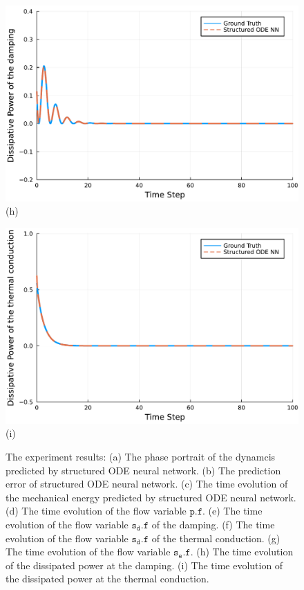 \documentclass[
	parskip, 			   %
	twoside, 			   %
	DIV=14, 			   %
	BCOR=15.0mm, 		   %
	headsepline, 		   %
	open=right, 		   %
	captions=tableheading, %
	bibliography=totoc,    %
	numbers=noenddot       %
]{scrreprt}
\begin{document}
\begin{figure}[h!]
\begin{minipage}{.3\textwidth}
    \includegraphics[width=1\linewidth]{figures/dissipative_power_damping_ndho_with_EPHS_structure.pdf}
    \\(h)
    \end{minipage}%
    \begin{minipage}{.3\textwidth}
    \centering
    \includegraphics[width=1\linewidth]{figures/dissipative_power_thermal_conduction_ndho_with_EPHS_structure.pdf}
    \\(i)
    \end{minipage}
    \caption{The experiment results: (a) The phase portrait of the dynamcis predicted by structured ODE neural network. (b) The prediction error of structured ODE neural network. (c) The time evolution of the mechanical energy predicted by structured ODE neural network. (d) The time evolution of the flow variable $\mathtt{p.f}$. (e) The time evolution of the flow variable $\mathtt{s_{d}.f}$ of the damping. (f) The time evolution of the flow variable $\mathtt{s_{d}.f}$ of the thermal conduction. (g) The time evolution of the flow variable $\mathtt{s_e.f}$. (h) The time evolution of the dissipated power at the damping. (i) The time evolution of the dissipated power at the thermal conduction.}
    \label{fig:ndho_experiment_with_EPHS_structure}
\end{figure}
\end{document}
